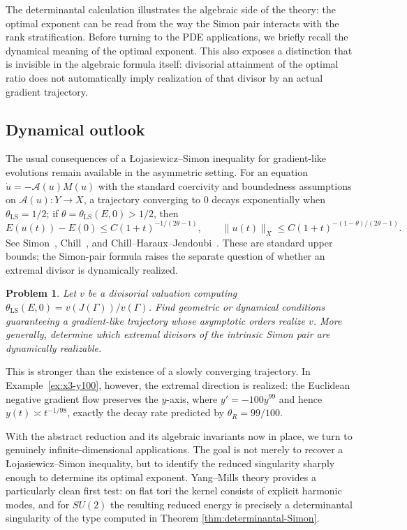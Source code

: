 \documentclass[11pt]{article}
\newtheorem{problem}[theorem]{Problem}
\theoremstyle{definition}
\theoremstyle{remark}
\begin{document}
The determinantal calculation illustrates the algebraic side of the theory: the optimal exponent can be read from the way the Simon pair interacts with the rank stratification. Before turning to the PDE applications, we briefly recall the dynamical meaning of the optimal exponent. This also exposes a distinction that is invisible in the algebraic formula itself: divisorial attainment of the optimal ratio does not automatically imply realization of that divisor by an actual gradient trajectory.

\subsection{Dynamical outlook}

The usual consequences of a \L{}ojasiewicz--Simon inequality for gradient-like evolutions remain available in the asymmetric setting. For an equation $\dot u=-\mathcal A(u)M(u)$ with the standard coercivity and boundedness assumptions on $\mathcal A(u):Y\to X$, a trajectory converging to $0$ decays exponentially when $\theta_{\mathrm{LS}}=1/2$; if $\theta=\theta_{\mathrm{LS}}(E,0)>1/2$, then
$$
E(u(t))-E(0)\le C(1+t)^{-1/(2\theta-1)},
\qquad
\|u(t)\|_X\le C(1+t)^{-(1-\theta)/(2\theta-1)}.
$$
See Simon~\cite{Simon1983}, Chill~\cite{Chill2003}, and Chill--Haraux--Jendoubi~\cite{ChillHarauxJendoubi2009}. These are standard upper bounds; the Simon-pair formula raises the separate question of whether an extremal divisor is dynamically realized.

\begin{problem}
\label{prob:valuative-realization}
Let $v$ be a divisorial valuation computing $\theta_{\mathrm{LS}}(E,0)=v(J(\Gamma))/v(\Gamma)$. Find geometric or dynamical conditions guaranteeing a gradient-like trajectory whose asymptotic orders realize $v$. More generally, determine which extremal divisors of the intrinsic Simon pair are dynamically realizable.
\end{problem}

This is stronger than the existence of a slowly converging trajectory. In Example~\ref{ex:x3-y100}, however, the extremal direction is realized: the Euclidean negative gradient flow preserves the $y$-axis, where $y'=-100y^{99}$ and hence $y(t)\asymp t^{-1/98}$, exactly the decay rate predicted by $\theta_R=99/100$.

With the abstract reduction and its algebraic invariants now in place, we turn to genuinely infinite-dimensional applications. The goal is not merely to recover a \L{}ojasiewicz--Simon inequality, but to identify the reduced singularity sharply enough to determine its optimal exponent. Yang--Mills theory provides a particularly clean first test: on flat tori the kernel consists of explicit harmonic modes, and for $SU(2)$ the resulting reduced energy is precisely a determinantal singularity of the type computed in Theorem \ref{thm:determinantal-Simon}.
\end{document}
